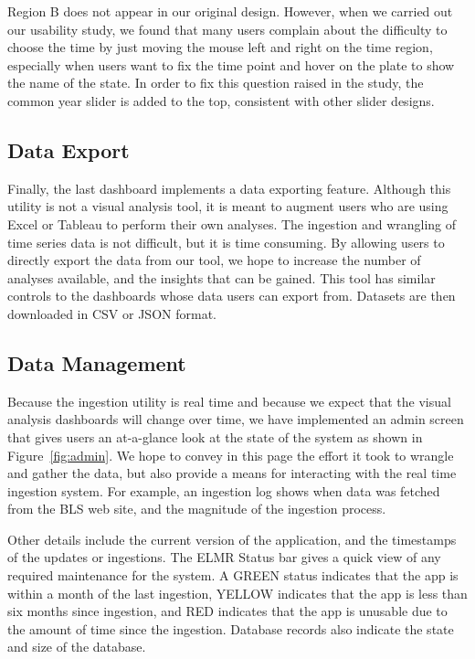 \documentclass{sigchi}
\begin{document}
Region B does not appear in our original design. However, when we carried out our usability study, we found that many users complain about the difficulty to choose the time by just moving the mouse left and right on the time region, especially when users want to fix the time point and hover on the plate to show the name of the state. In order to fix this question raised in the study, the common year slider is added to the top, consistent with other slider designs.

\subsection{Data Export}

Finally, the last dashboard implements a data exporting feature. Although this utility is not a visual analysis tool, it is meant to augment users who are using Excel or Tableau to perform their own analyses. The ingestion and wrangling of time series data is not difficult, but it is time consuming. By allowing users to directly export the data from our tool, we hope to increase the number of analyses available, and the insights that can be gained. This tool has similar controls to the dashboards whose data users can export from. Datasets are then downloaded in CSV or JSON format.

\subsection{Data Management}

Because the ingestion utility is real time and because we expect that the visual analysis dashboards will change over time, we have implemented an admin screen that gives users an at-a-glance look at the state of the system as shown in Figure~\ref{fig:admin}. We hope to convey in this page the effort it took to wrangle and gather the data, but also provide a means for interacting with the real time ingestion system. For example, an ingestion log shows when data was fetched from the BLS web site, and the magnitude of the ingestion process.

Other details include the current version of the application, and the timestamps of the updates or ingestions. The ELMR Status bar gives a quick view of any required maintenance for the system. A GREEN status indicates that the app is within a month of the last ingestion, YELLOW indicates that the app is less than six months since ingestion, and RED indicates that the app is unusable due to the amount of time since the ingestion. Database records also indicate the state and size of the database.
\end{document}

